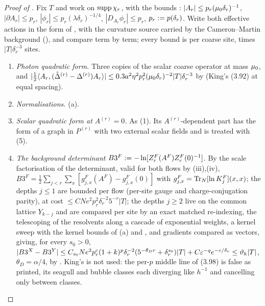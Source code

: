 \begin{proof}[Proof of ]
Fix $T$ and work on $\operatorname{supp}\chi_r$, with the bounds \cite[(3.2)]{K1}: $|A_r|\le p_r(\mu_0\delta_r)^{-1}$, $|\partial A_r|\le p_r$, $|\phi_r|\le p_r(\lambda\delta_r)^{-1/4}$, $|D_{A_r}\phi_r|\le p_r$, $p_r:= p(\delta_r)$. Write both effective actions in the form of , with the curvature source carried by the Cameron--Martin background (), and compare term by term; every bound is per coarse site, times $|T|\delta_r^{-3}$ sites.
\begin{enumerate}[leftmargin=*]
\item \emph{Photon quadratic form.} Three copies of the scalar coarse operator at mass $\mu_0$, and $|\frac12\langle A_r,(\hat\Delta^{(r)}-\Delta^{(r)})A_r\rangle|\le0.3a^2\eta^2p_r^2(\mu_0\delta_r)^{-2}|T|\delta_r^{-3}$ by  (King's (3.92) at equal spacing).
\item \emph{Normalisations.} (a).
\item \emph{Scalar quadratic form at $A^{(r)}=0$.} As (1). Its $A^{(r)}$-dependent part has the form of a graph in $P^{(r)}$ with two external scalar fields \cite[p.~669]{K1} and is treated with (5).
\item \emph{The background determinant} $B3^F:=-\ln[Z^F_r(A^F)Z^F_r(0)^{-1}]$. By the scale factorisation of the determinant, valid for both flows by (iii),(iv), $B3^F=\frac12\sum_{j<r}\sum_x[g^F_{j,x}(A^F)-g^F_{j,x}(0)]$ with $g^F_{j,x}=\operatorname{Tr}_N[\ln K^F_j](x,x)$; the depths $j\le1$ are bounded per flow (per-site gauge and charge-conjugation parity), at cost $\le CNe^2p_r^2\delta_r^{-2}5^{-r}|T|$; the depths $j\ge2$ live on the common lattice $Y_{k-j}$ and are compared per site by an exact matched re-indexing, the telescoping of the resolvents along a cascade of exponential weights, a kernel sweep with the kernel bounds of (a) and \cite[Thm.~3.3]{K1}, and gradients compared as vectors, giving, for every $s_0>0$, $|B3^X-B3^Y|\le C_{s_0}Ne^2p_r^c(1+k)^p\delta_r^{-2}(5^{-\theta_Dr}+\delta_r^{s_0})|T|+C\varepsilon^{-q}e^{-c/\delta_r}\le\vartheta_k|T|$, $\theta_D=\alpha/4$, by . King's \cite[(3.94)--(3.98)]{K1} is not used: the per-$p$ middle line of (3.98) is false as printed, its seagull and bubble classes each diverging like $h^{-1}$ and cancelling only between classes.

\end{enumerate}
\end{proof}
